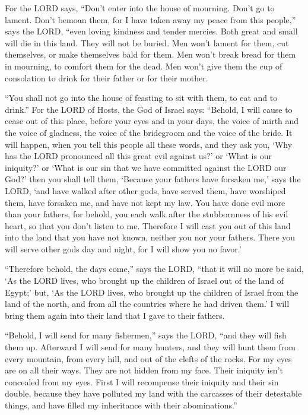 \myverse{}For the LORD says, “Don’t enter into the house of mourning. Don’t go to lament. Don’t bemoan them, for I have taken away my peace from this people,” says the LORD, “even loving kindness and tender mercies. \myverse{}Both great and small will die in this land. They will not be buried. Men won’t lament for them, cut themselves, or make themselves bald for them. \myverse{}Men won’t break bread for them in mourning, to comfort them for the dead. Men won’t give them the cup of consolation to drink for their father or for their mother. 

\myverse{}“You shall not go into the house of feasting to sit with them, to eat and to drink.” \myverse{}For the LORD of Hosts, the God of Israel says: “Behold, I will cause to cease out of this place, before your eyes and in your days, the voice of mirth and the voice of gladness, the voice of the bridegroom and the voice of the bride. \myverse{}It will happen, when you tell this people all these words, and they ask you, ‘Why has the LORD pronounced all this great evil against us?’ or ‘What is our iniquity?’ or ‘What is our sin that we have committed against the LORD our God?’ \myverse{}then you shall tell them, ‘Because your fathers have forsaken me,’ says the LORD, ‘and have walked after other gods, have served them, have worshiped them, have forsaken me, and have not kept my law. \myverse{}You have done evil more than your fathers, for behold, you each walk after the stubbornness of his evil heart, so that you don’t listen to me. \myverse{}Therefore I will cast you out of this land into the land that you have not known, neither you nor your fathers. There you will serve other gods day and night, for I will show you no favor.’


\myverse{}“Therefore behold, the days come,” says the LORD, “that it will no more be said, ‘As the LORD lives, who brought up the children of Israel out of the land of Egypt;’ \myverse{}but, ‘As the LORD lives, who brought up the children of Israel from the land of the north, and from all the countries where he had driven them.’ I will bring them again into their land that I gave to their fathers.


\myverse{}“Behold, I will send for many fishermen,” says the LORD, “and they will fish them up. Afterward I will send for many hunters, and they will hunt them from every mountain, from every hill, and out of the clefts of the rocks. \myverse{}For my eyes are on all their ways. They are not hidden from my face. Their iniquity isn’t concealed from my eyes. \myverse{}First I will recompense their iniquity and their sin double, because they have polluted my land with the carcasses of their detestable things, and have filled my inheritance with their abominations.”

